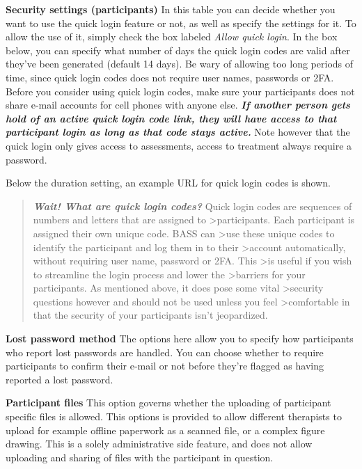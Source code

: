 \documentclass[
]{book}
\begin{document}
\textbf{Security settings (participants)}
In this table you can decide whether you want to use the quick login feature or not, as well as specify the settings for it. To allow the use of it, simply check the box labeled \emph{Allow quick login}.
In the box below, you can specify what number of days the quick login codes are valid after they've been generated (default 14 days). Be wary of allowing too long periods of time, since quick login codes does not require user names, passwords or 2FA. Before you consider using quick login codes, make sure your participants does not share e-mail accounts for cell phones with anyone else. \textbf{\emph{If another person gets hold of an active quick login code link, they will have access to that participant login as long as that code stays active.}} Note however that the quick login only gives access to assessments, access to treatment always require a password.

Below the duration setting, an example URL for quick login codes is shown.

\begin{quote}
\textbf{\emph{Wait! What are quick login codes?}}
Quick login codes are sequences of numbers and letters that are assigned to \textgreater participants. Each participant is assigned their own unique code. BASS can \textgreater use these unique codes to identify the participant and log them in to their \textgreater account automatically, without requiring user name, password or 2FA. This \textgreater is useful if you wish to streamline the login process and lower the \textgreater barriers for your participants. As mentioned above, it does pose some vital \textgreater security questions however and should not be used unless you feel \textgreater comfortable in that the security of your participants isn't jeopardized.
\end{quote}

\textbf{Lost password method}
The options here allow you to specify how participants who report lost passwords are handled. You can choose whether to require participants to confirm their e-mail or not before they're flagged as having reported a lost password.

\textbf{Participant files}
This option governs whether the uploading of participant specific files is allowed. This options is provided to allow different therapists to upload for example offline paperwork as a scanned file, or a complex figure drawing. This is a solely administrative side feature, and does not allow uploading and sharing of files with the participant in question.
\end{document}
